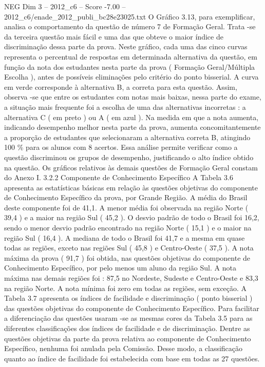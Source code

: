 \begin{textsample}{NEG Dim 3 – 2012\_c6 – Score -7.00 – 2012\_c6/enade\_2012\_publi\_bc28e23025.txt}
O Gráfico 3.13, para exemplificar, analisa o comportamento da questão de número 7 de Formação Geral.
Trata -se da terceira questão mais fácil e uma das que obteve o maior índice de discriminação dessa parte da prova.
Neste gráfico, cada uma das cinco curvas representa o percentual de respostas em determinada alternativa da questão, em função da nota dos estudantes nesta parte da prova ( Formação Geral/Múltipla Escolha ), antes de possíveis eliminações pelo critério do ponto bisserial.
A curva em verde corresponde à alternativa B, a correta para esta questão.
Assim, observa -se que entre os estudantes com notas mais baixas, nessa parte do exame, a situação mais frequente foi a escolha de uma das alternativas incorretas : a alternativa C ( em preto ) ou A ( em azul ).
Na medida em que a nota aumenta, indicando desempenho melhor nesta parte da prova, aumenta concomitantemente a proporção de estudantes que selecionaram a alternativa correta B, atingindo 100 \% para os alunos com 8 acertos.
Essa análise permite verificar como a questão discriminou os grupos de desempenho, justificando o alto índice obtido na questão.
Os gráficos relativos às demais questões de Formação Geral constam do Anexo I. 3.2.2 Componente de Conhecimento Específico A Tabela 3.6 apresenta as estatísticas básicas em relação às questões objetivas do componente de Conhecimento Específico da prova, por Grande Região.
A média do Brasil deste componente foi de 41,1.
A menor média foi observada na região Norte ( 39,4 ) e a maior na região Sul ( 45,2 ).
O desvio padrão de todo o Brasil foi 16,2, sendo o menor desvio padrão encontrado na região Norte ( 15,1 ) e o maior na região Sul ( 16,4 ).
A mediana de todo o Brasil foi 41,7 e a mesma em quase todas as regiões, exceto nas regiões Sul ( 45,8 ) e Centro-Oeste ( 37,5 ).
A nota máxima da prova ( 91,7 ) foi obtida, nas questões objetivas do componente de Conhecimento Específico, por pelo menos um aluno da região Sul.
A nota máxima nas demais regiões foi : 87,5 no Nordeste, Sudeste e Centro-Oeste e 83,3 na região Norte.
A nota mínima foi zero em todas as regiões, sem exceção.
A Tabela 3.7 apresenta os índices de facilidade e discriminação ( ponto bisserial ) das questões objetivas do componente de Conhecimento Específico.
Para facilitar a diferenciação das questões usaram -se as mesmas cores da Tabela 3.5 para as diferentes classificações dos índices de facilidade e de discriminação.
Dentre as questões objetivas da parte da prova relativa ao componente de Conhecimento Específico, nenhuma foi anulada pela Comissão.
Desse modo, a classificação quanto ao índice de facilidade foi estabelecida com base em todas as 27 questões.

\end{textsample}
